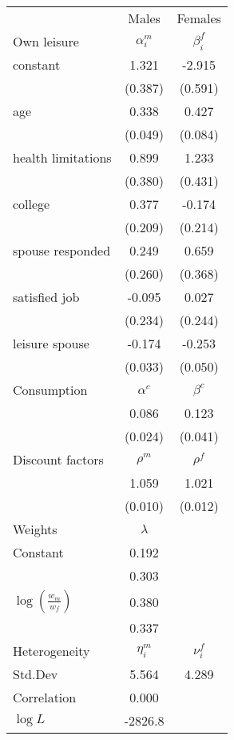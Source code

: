 \begin{tabular}{lcc} 
\hline\hline 
 & Males & Females \\ 
Own leisure & $\alpha_{i}^{m}$ & $\beta_{i}^{f}$ \\ 
constant & 1.321 & -2.915 \\ 
 & (0.387) & (0.591) \\ 
age & 0.338 & 0.427 \\ 
 & (0.049) & (0.084) \\ 
health limitations & 0.899 & 1.233 \\ 
 & (0.380) & (0.431) \\ 
college & 0.377 & -0.174 \\ 
 & (0.209) & (0.214) \\ 
spouse responded & 0.249 & 0.659 \\ 
 & (0.260) & (0.368) \\ 
satisfied job & -0.095 & 0.027 \\ 
 & (0.234) & (0.244) \\ 
leisure spouse & -0.174 & -0.253 \\ 
 & (0.033) & (0.050) \\ 
Consumption & $\alpha^{c}$ & $\beta^{c}$ \\ 
 & 0.086 & 0.123 \\ 
 & (0.024) & (0.041) \\ 
Discount factors & $\rho^m$ & $\rho^f$ \\ 
 & 1.059 & 1.021 \\ 
 & (0.010) & (0.012) \\ 
Weights & $\lambda$ &  \\ 
Constant & 0.192 &  \\ 
 & 0.303 &  \\ 
$\log(\frac{w_m}{w_f})$ & 0.380 &  \\ 
 & 0.337 &  \\ 
Heterogeneity & $\eta_i^m$ & $\nu_i^f$ \\ 
Std.Dev & 5.564 & 4.289 \\ 
Correlation & 0.000 &  \\ 
\hline 
$\log L$ & -2826.8 & \\ 
\hline \hline 
\end{tabular} 
